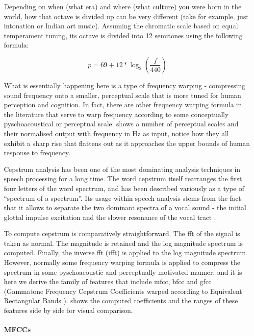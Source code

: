 {{Depending on when (what era) and where (what culture) you were born in the world, how that octave is divided up can be very different (take for example, just intonation or Indian art music). Assuming the chromatic scale based on equal temperament tuning, its octave is divided into 12 semitones using the following formula:

\begin{equation}
\label{eq:pitch}	
p = 69 + 12 * \log_2(\frac{f}{440})
\end{equation}

What is essentially happening here is a type of frequency warping - compressing sound frequency onto a smaller, perceptual scale that is more tuned for human perception and cognition. In fact, there are other frequency warping formula in the literature that serve to warp frequency according to some conceptually pyschoacoustical or perceptual scale.  shows a number of perceptual scales and their normalised output with frequency in Hz as input, notice how they all exhibit a sharp rise that flattens out as it approaches the upper bounds of human response to frequency.

Cepstrum analysis has been one of the most dominating analysis techniques in speech processing for a long time. The word cepstrum itself rearranges the first four letters of the word spectrum, and has been described variously as a type of ``spectrum of a spectrum''. Its usage within speech analysis stems from the fact that it allows to separate the two dominant spectra of a vocal sound - the initial glottal impulse excitation and the slower resonance of the vocal tract \citep{Roads1996, Kim2006}.

To compute cepstrum is comparatively straightforward. The \acrshort{fft} of the signal is taken as normal. The magnitude is retained and the log magnitude spectrum is computed. Finally, the inverse \acrshort{fft} (\acrshort{ifft}) is applied to the log magnitude spectrum. However, normally some frequency warping formula is applied to compress the spectrum in some pyschoacoustic and perceptually motivated manner, and it is here we derive the family of features that include \acrfull{mfcc}, \acrfull{bfcc} and \acrshort{gfcc} (Gammatone Frequency Cepstrum Coefficients warped according to Equivalent Rectangular Bands \citep{Shao2009}).  shows the computed coefficients and the ranges of these features side by side for visual comparison.

\paragraph{MFCCs}

}}
